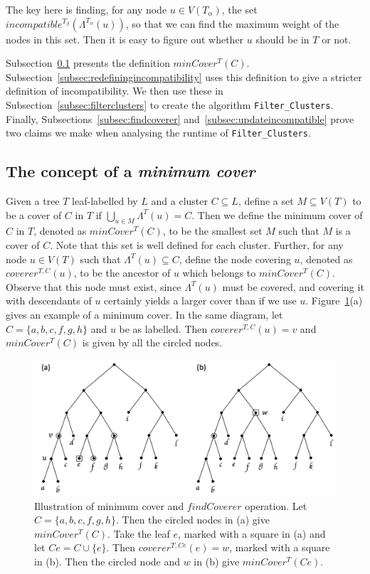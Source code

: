\documentclass[12pt,a4paper]{article}
\newcommand{\leafset}{\Lambda}
\newcommand{\TA}{T_\alpha}
\newcommand{\TB}{T_\beta}
\begin{document}
    The key here is finding, for any node $u \in V(\TA)$, the set $incompatible^{\TB}(\leafset^{\TA}(u))$, so that we can find the maximum weight of the nodes in this set. Then it is easy to figure out whether $u$ should be in $T$ or not.

    Subsection~\ref{subsec:mincover} presents the definition $minCover^{T}(C)$. Subsection~\ref{subsec:redefiningincompatibility} uses this definition to give a stricter definition of incompatibility. We then use these in Subsection~\ref{subsec:filterclusters} to create the algorithm \texttt{Filter\_Clusters}. Finally, Subsections~\ref{subsec:findcoverer} and~\ref{subsec:updateincompatible} prove two claims we make when analysing the runtime of \texttt{Filter\_Clusters}.

    \subsection{The concept of a \textit{minimum cover}}
    \label{subsec:mincover}

    Given a tree $T$ leaf-labelled by $L$ and a cluster $C \subseteq L$, define a set $M \subseteq V(T)$ to be a cover of $C$ in $T$ if $\bigcup_{u \in M} \leafset^{T}(u) = C$. Then we define the minimum cover of $C$ in $T$, denoted as $minCover^{T}(C)$, to be the smallest set $M$ such that $M$ is a cover of $C$. Note that this set is well defined for each cluster. Further, for any node $u \in V(T)$ such that $\leafset^{T}(u) \subseteq C$, define the node covering $u$, denoted as $coverer^{T, C}(u)$, to be the ancestor of $u$ which belongs to $minCover^{T}(C)$. Observe that this node must exist, since $\leafset^{T}(u)$ must be covered, and covering it with descendants of $u$ certainly yields a larger cover than if we use $u$. Figure~\ref{fig:mincoverrecursive}(a) gives an example of a minimum cover. In the same diagram, let $C = \{a, b, c, f, g, h\}$ and $u$ be as labelled. Then $coverer^{T, C}(u) = v$ and $minCover^{T}(C)$ is given by all the circled nodes.

    \begin{figure}[ht]
        \includegraphics[scale=0.48]{mincoverrecursive}
        \centering
        \caption[Minimum cover and the $findCoverer$ operation]{Illustration of minimum cover and $findCoverer$ operation. Let $C = \{a, b, c, f, g, h\}$. Then the circled nodes in (a) give $minCover^{T}(C)$. Take the leaf $e$, marked with a square in (a) and let $Ce = C \cup \{e\}$. Then $coverer^{T, Ce}(e) = w$, marked with a square in (b). Then the circled node and $w$ in (b) give $minCover^{T}(Ce)$.}
        \label{fig:mincoverrecursive}
    \end{figure}
\end{document}
